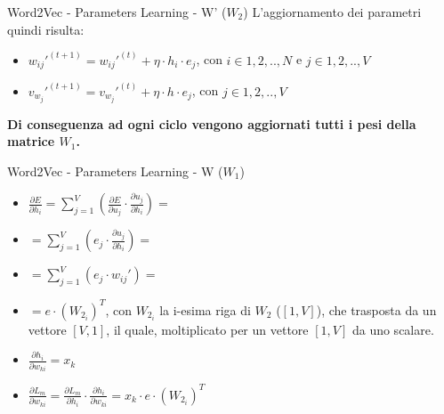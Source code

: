 \documentclass[british]{beamer}
\begin{document}
\begin{frame}{Word2Vec - Parameters Learning - W' (\(W_2\))}
	L'aggiornamento dei parametri quindi risulta:
	\begin{itemize}
		\item \( w_{ij}'^{(t+1)} = w_{ij}'^{(t)} + \eta\cdot h_i \cdot e_j\), con \(i \in {1,2,..,N}\) e \(j \in {1,2,..,V}\)
		\item \( v_{w_{j}}'^{(t+1)} = v_{w_{j}}'^{(t)} + \eta\cdot h \cdot e_j\), con \(j \in {1,2,..,V}\)
	\end{itemize}
	\textbf{Di conseguenza ad ogni ciclo vengono aggiornati tutti i pesi della matrice \(W_1\).}
\end{frame}

\begin{frame}{Word2Vec - Parameters Learning - W (\(W_1\))}
	\begin{itemize}
		\item \( \frac{\partial E}{\partial h_i} = \sum_{j=1}^{V} \left(\frac{\partial E}{\partial u_j} \cdot \frac{\partial u_j}{\partial h_i}\right) = \)
		\item \( = \sum_{j=1}^{V} \left(e_j \cdot \frac{\partial u_j}{\partial h_i}\right) = \)
		\item \( = \sum_{j=1}^{V} \left(e_j \cdot w_{ij}'\right) = \)
		\item \( = e \cdot (W_{2_{i}})^T\), con \(W_{2_{i}}\) la i-esima riga di \(W_2\) (\([1,V]\)), che trasposta da un vettore \([V,1]\), il quale, moltiplicato per un vettore \([1,V]\) da uno scalare.
		\item \(\frac{\partial h_i}{\partial w_{ki}} = x_k\)
		\item \(\frac{\partial L_m}{\partial w_{ki}} = \frac{\partial L_m}{\partial h_i} \cdot \frac{\partial h_i}{\partial w_{ki}} = x_k \cdot e \cdot (W_{2_{i}})^T\)
	\end{itemize}
\end{frame}
\end{document}
